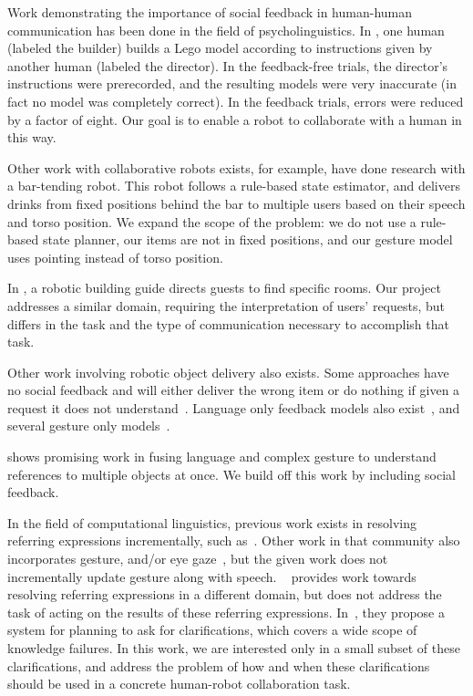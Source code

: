 \documentclass[conference]{IEEEtran}
\begin{document}
Work demonstrating the importance of social feedback in human-human
communication has been done in the field of psycholinguistics. In  \citet{clark04}, one human (labeled the builder)
builds a Lego model according to instructions given by another human
(labeled the director). In the feedback-free trials, the director's
instructions were prerecorded, and the resulting models were very
inaccurate (in fact no model was completely correct). In the feedback
trials, errors were reduced by a factor of eight. Our goal is to
enable a robot to collaborate with a human in this way.


Other work with collaborative robots exists, for example, \cite{foster12} have done research with a bar-tending robot. This robot follows a rule-based state estimator, and delivers drinks from fixed positions behind the bar to multiple users based on their speech and torso position. 
We expand the scope of the problem: we do not use a rule-based state planner, our items are not in fixed positions, and our gesture model uses pointing instead of torso position. 

In \cite{bohus14},  a robotic building guide directs guests to find specific rooms. Our project addresses a similar domain, requiring the interpretation of users' requests, but differs in the task and the type of communication necessary to accomplish that task. 

Other work involving robotic object delivery also exists. Some approaches have no social feedback and will either deliver the wrong item or do nothing if given a
request it does not understand~\citep{tellex11,matuszek12,tellex12,misra14}. Language only feedback models also 
exist~\citep{chai14,macmahon06,tellex11,matuszek12,guadarrama14,hewlett11,misra14}, and several gesture only models~\citep{waldherr00,marge11}.


\cite{matuszek14} shows promising work in fusing language and complex gesture to understand references to multiple objects at once. We build off this work by including social feedback. 

In the field of computational linguistics, previous work exists in resolving referring expressions incrementally, such as~\cite{schlangen09,Zender2008Conceptual,Gieselmann}. Other work in that community also incorporates gesture, and/or eye gaze~\citep{kennington13,kennington15a}, but the given work does not incrementally update gesture along with speech. ~\cite{chairmi} provides work towards resolving referring expressions in a different domain, but does not address the task of acting on the results of these referring expressions. In~\cite{kruijffclarification}, they propose a system for planning to ask for clarifications, which covers a wide scope of knowledge failures. In this work, we are interested only in a small subset of these clarifications, and address the problem of how and when these clarifications should be used in a concrete human-robot collaboration task. 
\end{document}
